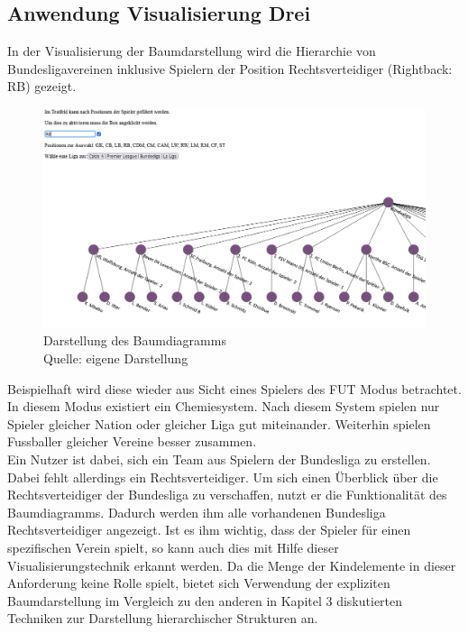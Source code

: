 \documentclass[usegeometry=true]{scrartcl}
\begin{document}
\subsection{Anwendung Visualisierung Drei}
In der Visualisierung der Baumdarstellung wird die Hierarchie von Bundesligavereinen inklusive Spielern der Position Rechtsverteidiger (Rightback: RB) gezeigt.\\
\begin{figure}[h!]
\centering
\includegraphics[scale=0.6]{grafiken/Baumdiagramm5}
\caption{Darstellung des Baumdiagramms\\ Quelle: eigene Darstellung}
\label{BD5}
\end{figure}

Beispielhaft wird diese wieder aus Sicht eines Spielers des FUT Modus betrachtet. In diesem Modus existiert ein Chemiesystem.\cite{heib_fifa_2021} Nach diesem System spielen nur Spieler gleicher Nation oder gleicher Liga gut miteinander. Weiterhin spielen Fussballer gleicher Vereine besser zusammen.\\
Ein Nutzer ist dabei, sich ein Team aus Spielern der Bundesliga zu erstellen. Dabei fehlt allerdings ein Rechtsverteidiger. Um sich einen Überblick über die Rechtsverteidiger der Bundesliga zu verschaffen, nutzt er die Funktionalität des Baumdiagramms. Dadurch werden ihm alle vorhandenen Bundesliga Rechtsverteidiger angezeigt. Ist es ihm wichtig, dass der Spieler für einen spezifischen Verein spielt, so kann auch dies mit Hilfe dieser Visualisierungstechnik erkannt werden. Da die Menge der Kindelemente in dieser Anforderung keine Rolle spielt, bietet sich Verwendung der expliziten Baumdarstellung im Vergleich zu den anderen in Kapitel 3 diskutierten Techniken zur Darstellung hierarchischer Strukturen an.
\end{document}
